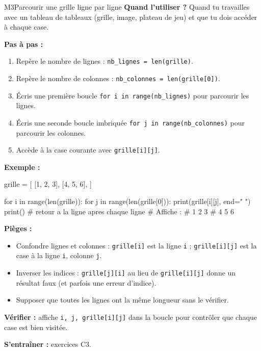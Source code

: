 \begin{fichemethode}{M3}{Parcourir une grille ligne par ligne}
\textbf{Quand l'utiliser ?} Quand tu travailles avec un tableau de tableaux (grille, image, plateau de jeu) et que tu dois accéder à chaque case.

\textbf{Pas à pas :}
\begin{enumerate}
  \item Repère le nombre de lignes : \lstinline{nb_lignes = len(grille)}.
  \item Repère le nombre de colonnes : \lstinline{nb_colonnes = len(grille[0])}.
  \item Écris une première boucle \lstinline{for i in range(nb_lignes)} pour parcourir les lignes.
  \item Écris une seconde boucle imbriquée \lstinline{for j in range(nb_colonnes)} pour parcourir les colonnes.
  \item Accède à la case courante avec \lstinline{grille[i][j]}.
\end{enumerate}

\textbf{Exemple :}
\begin{python}
grille = [
    [1, 2, 3],
    [4, 5, 6],
]

for i in range(len(grille)):
    for j in range(len(grille[0])):
        print(grille[i][j], end=" ")
    print()  # retour a la ligne apres chaque ligne
# Affiche :
# 1 2 3
# 4 5 6
\end{python}

\textbf{Pièges :}
\begin{itemize}
  \item Confondre lignes et colonnes : \lstinline{grille[i]} est la ligne \lstinline{i} ; \lstinline{grille[i][j]} est la case à la ligne \lstinline{i}, colonne \lstinline{j}.
  \item Inverser les indices : \lstinline{grille[j][i]} au lieu de \lstinline{grille[i][j]} donne un résultat faux (et parfois une erreur d'indice).
  \item Supposer que toutes les lignes ont la même longueur sans le vérifier.
\end{itemize}

\textbf{Vérifier :} affiche \lstinline{i, j, grille[i][j]} dans la boucle pour contrôler que chaque case est bien visitée.

\textbf{S'entraîner :} exercices C3.
\end{fichemethode}
